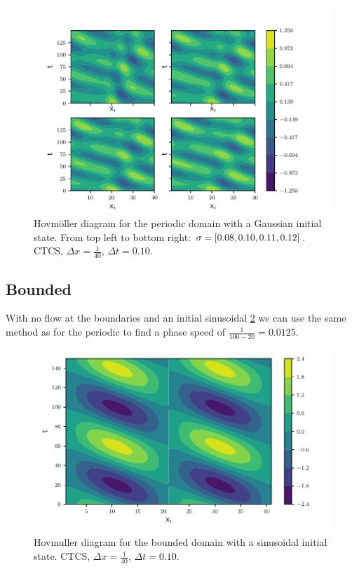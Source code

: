 \begin{figure}[htp]
  \centering
  \includegraphics[width=\textwidth]{../figures/hovmuller_sigma.pdf}
  \caption{Hovmöller diagram for the periodic domain with a Gaussian initial
  state.
  From top left to bottom right: $\sigma = \left[0.08, 0.10, 0.11, 0.12\right]$. CTCS, $\Delta x = \frac{1}{40}$, $\Delta t = 0.10$.
  }
  \label{fig:periodic_gauss}
\end{figure}



\subsection{Bounded}

With no flow at the boundaries and an initial sinusoidal \cref{fig:bounded_sine}
we can use the same method as for the periodic to find a phase speed of
$\frac{1}{100 - 20} = 0.0125$.


\begin{figure}[htp]
  \centering
  \includegraphics[width=\textwidth]{../figures/psi_bounded_centered_sine.pdf}
  \caption{Hovmuller diagram for the bounded domain with a sinusoidal initial
  state. CTCS, $\Delta x = \frac{1}{40}$, $\Delta t = 0.10$.}
  \label{fig:bounded_sine}
\end{figure}


